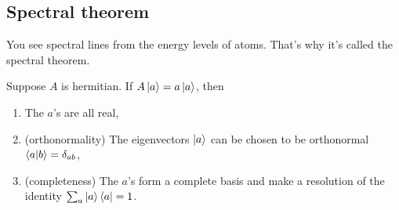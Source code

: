 \subsection{Spectral theorem}
You see spectral lines from the energy levels of atoms.
That's why it's called the spectral theorem.
\begin{theorem}
    Suppose $A$ is hermitian.
    If $A\ket{a} = a\ket{a}$,
    then
    \begin{enumerate}
        \item The $a$'s are all real,
        \item (orthonormality) The eigenvectors $\ket{a}$ can be chosen to be
            orthonormal
            $\braket{a}{b} = \delta_{ab}$,
        \item (completeness) The $a$'s form a complete basis and make a
            resolution of the identity
            $\sum_a \ket{a}\bra{a} = 1$.
    \end{enumerate}
\end{theorem}
